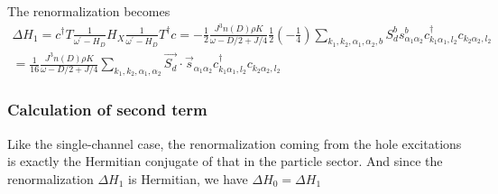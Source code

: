 The renormalization becomes
\begin{equation}\begin{aligned}
	\Delta H_1 = c^\dagger T \frac{1}{\omega^\prime - H_D} H_X \frac{1}{\omega^\prime - H_D} T^\dagger c = -\frac{1}{2}\frac{J^3 n(D) \rho K}{\omega - D/2 + J/4}\frac{1}{2}\left( -\frac{1}{4} \right) \sum_{k_1,k_2,\alpha_1,\alpha_2,b} S_d^b s^b_{\alpha_1 \alpha_2} c^\dagger_{k_1\alpha_1,l_2}c_{k_2 \alpha_2,l_2}\\
=\frac{1}{16}\frac{J^3 n(D) \rho K}{\omega - D/2 + J/4} \sum_{k_1,k_2,\alpha_1,\alpha_2} \vec{S_d}\cdot\vec{s}_{\alpha_1 \alpha_2} c^\dagger_{k_1\alpha_1,l_2}c_{k_2 \alpha_2,l_2}
\end{aligned}\end{equation}

\subsubsection{Calculation of second term}
Like the single-channel case, the renormalization coming from the hole excitations is exactly the Hermitian conjugate of that in the particle sector. And since the renormalization \(\Delta H_1\) is Hermitian, we have \(\Delta H_0 = \Delta H_1\)

